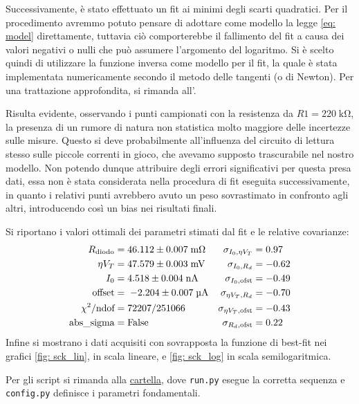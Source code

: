 \documentclass{article}[a4paper, oneside, 11pt]
\begin{document}
Successivamente, è stato effettuato un fit ai minimi degli scarti quadratici.
Per il procedimento avremmo potuto pensare di adottare come modello la legge
\eqref{eq: model} direttamente, tuttavia ciò comporterebbe il fallimento del
fit a causa dei valori negativi o nulli che può assumere l'argomento del
logaritmo. Si è scelto quindi di utilizzare la funzione inversa come modello
per il fit, la quale è stata implementata numericamente secondo il metodo
delle tangenti (o di Newton).
Per una trattazione approfondita, si rimanda all'.

Risulta evidente, osservando i punti campionati con la resistenza da
$R1 = 220 \; \si{\kohm}$, la presenza di un rumore di natura non statistica
molto maggiore delle incertezze sulle misure. 
Questo si deve probabilmente all'influenza del circuito di lettura
stesso sulle piccole correnti in gioco, che avevamo supposto trascurabile
nel nostro modello. Non potendo dunque attribuire degli errori significativi
per questa presa dati, essa non è stata considerata nella procedura di
fit eseguita successivamente, in quanto i relativi punti avrebbero avuto un
peso sovrastimato in confronto agli altri, introducendo così un bias
nei risultati finali.
 
Si riportano i valori ottimali dei parametri stimati dal fit e le relative
covarianze: %
\begin{align*}
	R_{\text{diodo}} &= 46.112\iffalse 18 \fi \pm 0.007\iffalse 2 \fi \; \si{\mohm} 
	&\sigma_{I_0, \eta V_T} &= 0.97  \\
	\eta V_T &= 47.579\iffalse 86 \fi \pm 0.003\iffalse 3 \fi \; \si{\mV} 	
	&\sigma_{I_0, R_d} &= -0.62 \\
	I_0 &= 4.518\iffalse 0 \fi \pm 0.004\iffalse 3 \fi \; \si{\nA}
	&\sigma_{I_0, \text{ofst}} &= -0.49 \\
	\text{offset} &=\; - 2.204\iffalse 3 \fi \pm 0.007 \iffalse 3 \fi \; \si{\uA}
	&\sigma_{\eta V_T, R_d} &= -0.70  \\ 
	\chi^2/\text{ndof} &= 72207/251066
	&\sigma_{\eta V_T, \text{ofst}} &= -0.43\\
	\text{abs\_sigma} &= \rm False
	&\sigma_{R_d, \text{ofst}} &= 0.22
\end{align*}
Infine si mostrano i dati acquisiti con sovrapposta la funzione di best-fit
nei grafici \ref{fig: sck_lin}, in scala lineare, e \ref{fig: sck_log}
in scala semilogaritmica. 

Per gli script si rimanda alla 
\href{https://github.com/LucaCiucci/relaz_seme/tree/master/Cartella_fit}
{cartella}, dove \verb+run.py+ esegue la corretta sequenza e \verb+config.py+
definisce i parametri fondamentali.
\end{document}
